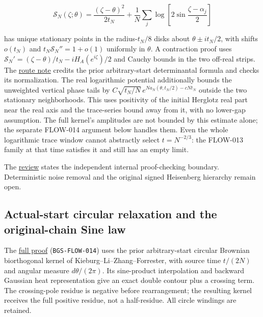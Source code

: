 \[
\mathcal S_N(\zeta;\theta)=\frac{(\zeta-\theta)^2}{2t_N}
+\frac1N\sum_j\log\left[2\sin\frac{\zeta-\alpha_j}{2}\right]
\]

has unique stationary points in the radius-\(t_N/8\) disks about
\(\theta\pm it_N/2\), with shifts \(o(t_N)\) and
\(t_N\mathcal S_N''=1+o(1)\) uniformly in \(\theta\).
A contraction proof uses \(\mathcal S_N'=(\zeta-\theta)/t_N -iH_A(e^{i\zeta})/2\) and Cauchy bounds in the two off-real strips.
The \href{https://github.com/ChurilovMaksim/BGS/blob/main/record/circular_kernel_route_20261004.md}{route note} credits the
prior arbitrary-start determinantal formula and checks its normalization.
The real logarithmic potential additionally bounds the unweighted
vertical phase tails by \(C\sqrt{t_N/N}\,e^{N a_N(\theta,t_N/2)-cNt_N}\)
outside the two stationary neighborhoods. This uses positivity of the
initial Herglotz real part near the real axis and the trace-series bound
away from it, with no lower-gap assumption. The full kernel's amplitudes
are not bounded by this estimate alone; the separate FLOW-014 argument
below handles them. Even the whole
logarithmic trace window cannot abstractly select \(t=N^{-2/3}\):
the FLOW-013 family at that time satisfies it and still has an empty limit.

The \href{https://github.com/ChurilovMaksim/BGS/blob/main/archive/record/general_start_review_20261004.md}{review} states the
independent internal proof-checking boundary. Deterministic noise removal
and the original signed Heisenberg hierarchy remain open.

\hypertarget{actual-start-circular-relaxation-and-the-original-chain-sine-law}{%
\subsection{Actual-start circular relaxation and the original-chain Sine law}\label{actual-start-circular-relaxation-and-the-original-chain-sine-law}}

The \href{https://github.com/ChurilovMaksim/BGS/blob/main/mathematics/circular_dyson_actual_start.md}{full proof} (\texttt{BGS-FLOW-014}) uses
the prior arbitrary-start circular Brownian biorthogonal kernel of
Kieburg--Li--Zhang--Forrester, with source time \(t/(2N)\) and angular
measure \(d\theta/(2\pi)\). Its sine-product interpolation and backward
Gaussian heat representation give an exact double contour plus a
crossing term. The crossing-pole residue is negative before rearrangement;
the resulting kernel receives the full positive residue, not a half-residue.
All circle windings are retained.

